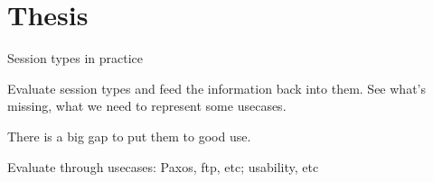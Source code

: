\section{Thesis}




Session types in practice

Evaluate session types and feed the information back into them. See what's missing, what we need to represent some usecases.

There is a big gap to put them to good use.

Evaluate through usecases: Paxos, ftp, etc; usability, etc
